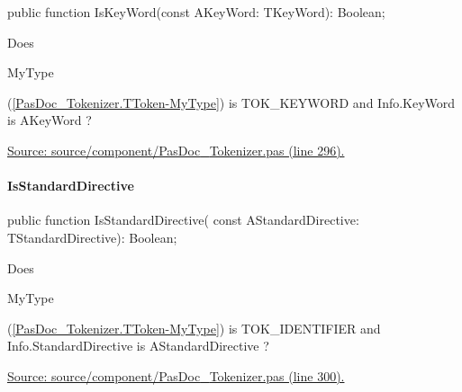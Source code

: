 \documentclass{report}
\newif\ifpdf
\begin{document}
\label{PasDoc_Tokenizer.TToken-IsKeyWord}
\begin{list}{}{
\setlength{\itemindent}{0cm}
\setlength{\listparindent}{0cm}
\setlength{\leftmargin}{\evensidemargin}
\addtolength{\leftmargin}{\tmplength}
\settowidth{\labelsep}{X}
\addtolength{\leftmargin}{\labelsep}
\setlength{\labelwidth}{\tmplength}
}
\item[\textbf{Declaration}\hfill]
\ifpdf
\begin{flushleft}
\fi
\begin{ttfamily}
public function IsKeyWord(const AKeyWord: TKeyWord): Boolean;\end{ttfamily}

\ifpdf
\end{flushleft}
\fi

\par
\item[\textbf{Description}]
Does \begin{ttfamily}MyType\end{ttfamily}(\ref{PasDoc_Tokenizer.TToken-MyType}) is TOK{\_}KEYWORD and Info.KeyWord is AKeyWord ?\par
\href{https://github.com/pasdoc/pasdoc/blob/master/source/component/PasDoc_Tokenizer.pas#L296}{Source: source/component/PasDoc{\_}Tokenizer.pas (line 296).}

\end{list}
\paragraph*{IsStandardDirective}\hspace*{\fill}

\label{PasDoc_Tokenizer.TToken-IsStandardDirective}
\begin{list}{}{
\setlength{\itemindent}{0cm}
\setlength{\listparindent}{0cm}
\setlength{\leftmargin}{\evensidemargin}
\addtolength{\leftmargin}{\tmplength}
\settowidth{\labelsep}{X}
\addtolength{\leftmargin}{\labelsep}
\setlength{\labelwidth}{\tmplength}
}
\item[\textbf{Declaration}\hfill]
\ifpdf
\begin{flushleft}
\fi
\begin{ttfamily}
public function IsStandardDirective( const AStandardDirective: TStandardDirective): Boolean;\end{ttfamily}

\ifpdf
\end{flushleft}
\fi

\par
\item[\textbf{Description}]
Does \begin{ttfamily}MyType\end{ttfamily}(\ref{PasDoc_Tokenizer.TToken-MyType}) is TOK{\_}IDENTIFIER and Info.StandardDirective is AStandardDirective ?\par
\href{https://github.com/pasdoc/pasdoc/blob/master/source/component/PasDoc_Tokenizer.pas#L300}{Source: source/component/PasDoc{\_}Tokenizer.pas (line 300).}

\end{list}
\end{document}
